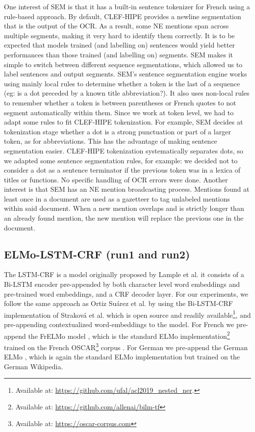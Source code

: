 One interest of SEM is that it has a built-in sentence tokenizer for French using a rule-based approach. By default, CLEF-HIPE provides a newline segmentation that is the output of the OCR. As a result, some NE mentions span across multiple segments, making it very hard to identify them correctly. It is to be expected that models trained (and labelling on) sentences would yield better performances than those trained (and labelling on) segments. SEM makes it simple to switch between different sequence segmentations, which allowed us to label sentences and output segments.
SEM's sentence segmentation engine works using mainly local rules to determine whether a token is the last of a sequence (eg: is a dot preceded by a known title abbreviation?). It also uses non-local rules to remember whether a token is between parentheses or French quotes to not segment automatically within them. Since we work at token level, we had to adapt some rules to fit CLEF-HIPE tokenization. For example, SEM decides at tokenization stage whether a dot is a strong punctuation or part of a larger token, as for abbreviations. This has the advantage of making sentence segmentation easier. CLEF-HIPE tokenization systematically separates dots, so we adapted some sentence segmentation rules, for example: we decided not to consider a dot as a sentence terminator if the previous token was in a lexica of titles or functions. No specific handling of OCR errors were done.
Another interest is that SEM has an NE mention broadcasting process. Mentions found at least once in a document are used as a gazetteer to tag unlabeled mentions within said document. When a new mention overlaps and is strictly longer than an already found mention, the new mention will replace the previous one in the document.

\subsection{ELMo-LSTM-CRF (run1 and run2)}

The LSTM-CRF is a model originally proposed by Lample et al. \cite{lample-etal-2016-neural} it consists of a Bi-LSTM encoder pre-appended by both character level word embeddings and pre-trained word embeddings, and a CRF decoder layer. For our experiments, we follow the same approach as Ortiz Suárez et al. \cite{ortiz-suarez-etal-2020-establishing} by using the Bi-LSTM-CRF implementation of Straková et al. \cite{strakova-etal-2019-neural} which is open source and readily available\footnote{Available at: \url{https://github.com/ufal/acl2019_nested_ner}.}, and pre-appending contextualized word-embeddings to the model. For French we pre-append the FrELMo model \cite{ortiz-suarez-etal-2020-establishing}, which is the standard ELMo \cite{peters-etal-2018-deep} implementation\footnote{Available at: \url{https://github.com/allenai/bilm-tf}} trained on the French OSCAR\footnote{Available at: \url{https://oscar-corpus.com}} corpus \cite{ortiz-suarez-etal-2020-monolingual} \cite{ortiz-suarez-etal-2019-asynchronous}. For German we pre-append the German ELMo \cite{may-2019-german}, which is again the standard ELMo implementation but trained on the German Wikipedia.

